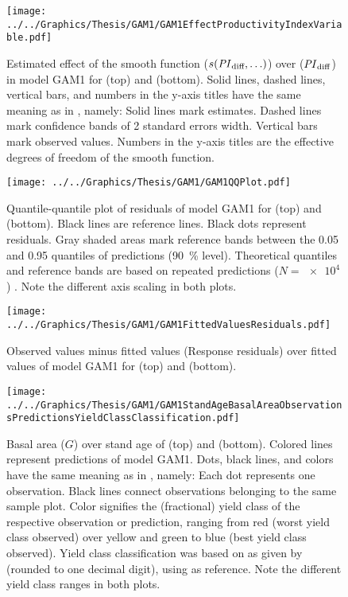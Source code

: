 \begin{figure}[h]
  \centering
  \texttt{[image: ../../Graphics/Thesis/GAM1/GAM1EffectProductivityIndexVariable.pdf]}
  \caption{Estimated effect of the \ProductivityIndexVariableText{} smooth function (\(s(\mathit{PI}_{\text{diff}}{}, \ldots)\)) over \ProductivityIndexVariableText{} (\(\mathit{PI}_{\text{diff}}{}\)) in model GAM1 for \Beech{} (top) and \Spruce{} (bottom).  Solid lines, dashed lines, vertical bars, and numbers in the y-axis titles have the same meaning as in , namely:  Solid lines mark estimates.  Dashed lines mark confidence bands of 2 standard errors width.  Vertical bars mark observed values.  Numbers in the y-axis titles are the effective degrees of freedom of the smooth function.}
  \label{fig:GAM1EffectProductivityIndexVariable}
\end{figure}

\begin{figure}[h]
  \centering
  \texttt{[image: ../../Graphics/Thesis/GAM1/GAM1QQPlot.pdf]}
  \caption{Quantile-quantile plot of residuals of model GAM1 for \Beech{} (top) and \Spruce{} (bottom).  Black lines are reference lines.  Black dots represent residuals.  Gray shaded areas mark reference bands between the \num{0.05} and \num{0.95} quantiles of predictions (\SI{90}{\percent} level).  Theoretical quantiles and reference bands are based on repeated predictions (\(N = \num{e4}\)) \parencite{Augustin2012}.  Note the different axis scaling in both plots.}
  \label{fig:GAM1QQPlot}
\end{figure}

\begin{figure}[h]
  \centering
  \texttt{[image: ../../Graphics/Thesis/GAM1/GAM1FittedValuesResiduals.pdf]}
  \caption{Observed values minus fitted values (Response residuals) over fitted values of model GAM1 for \Beech{} (top) and \Spruce{} (bottom).}
  \label{fig:GAM1FittedValuesResiduals}
\end{figure}

\begin{figure}[h]
  \centering
  \texttt{[image: ../../Graphics/Thesis/GAM1/GAM1StandAgeBasalAreaObservationsPredictionsYieldClassClassification.pdf]}
  \caption{Basal area (\(G\)) over stand age of \Beech{} (top) and \Spruce{} (bottom).  Colored lines represent predictions of model GAM1.  Dots, black lines, and colors have the same meaning as in , namely:  Each dot represents one observation.  Black lines connect observations belonging to the same sample plot.  Color signifies the (fractional) yield class of the respective observation or prediction, ranging from red (worst yield class observed) over yellow and green to blue (best yield class observed).  Yield class classification was based on \ProductivityIndexText{} as given by  (rounded to one decimal digit), using  as reference.  Note the different yield class ranges in both plots.}
  \label{fig:GAM1StandAgeBasalAreaObservationsPredictionsYieldClassClassification}
\end{figure}

